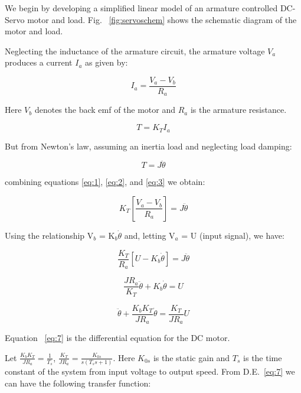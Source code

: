 \documentclass[11pt,a4paper]{article}
\begin{document}
We begin by developing a simplified linear model of an armature controlled DC-Servo motor and load. Fig. ~\ref{fig:servoschem} shows the schematic diagram of the motor and load.

Neglecting the inductance of the armature circuit, the armature voltage $V_{a}$ produces a current $I_{a}$ as given by:

\begin{equation} \label{eq:1}
I_{a} = \frac{V_{a}-V_{b}}{R_{a}}
\end{equation}

Here $V_{b}$ denotes the back emf of the motor and $R_{a}$ is the armature resistance.

\begin{equation} \label{eq:2}
T=K_{T}I_{a}
\end{equation}

But from Newton's law, assuming an inertia load and neglecting load damping:

\begin{equation} \label{eq:3}
T = J\ddot{\theta}
\end{equation}

combining equations \ref{eq:1}, \ref{eq:2}, and \ref{eq:3} we obtain:

\begin{equation} \label{eq:4}
K_{T}\left[\frac{V_{a}-V_{b}}{R_{a}}\right] = J\ddot{\theta}
\end{equation} 

Using the relationship V$_{b}$ = K$_{b}\dot{\theta}$ and, letting V$_{a}$ = U (input signal), we have:

\begin{equation} \label{eq:5}
\frac{K_{T}}{R_{a}}\left[U-K_{b}\dot{\theta}\right] = J\ddot{\theta}
\end{equation}

\begin{equation} \label{eq:6}
\frac{JR_{a}}{K_{T}}\ddot{\theta}+ K_{b}\dot{\theta} = U
\end{equation}

\begin{equation} \label{eq:7}
\ddot{\theta} + \frac{K_{b}K_{T}}{JR_{a}}\dot{\theta} = \frac{K_{T}}{JR_{a}}U
\end{equation}

Equation ~\ref{eq:7} is the differential equation for the DC motor.

Let $\frac{K_{b}K_{T}}{JR_{a}}=\frac{1}{T_{s}}$, $\frac{K_{T}}{JR_{a}} = \frac{K_{0s}}{s(T_{s}s+1)}$. Here $K_{0s}$ is the static gain and $T_{s}$ is the time constant of the system from input voltage to output speed. From D.E.~\ref{eq:7} we can have the following transfer function:
\end{document}
